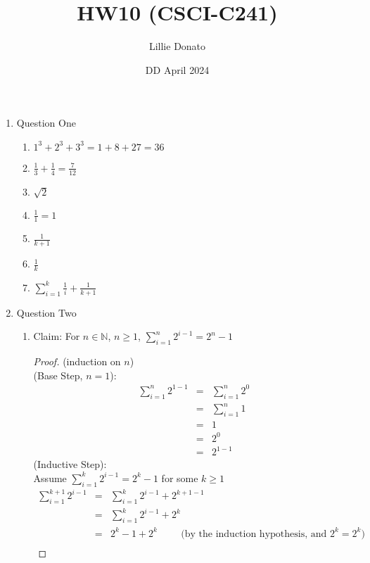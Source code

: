 \documentclass{article}
\title{HW10 (CSCI-C241)}
\author{Lillie Donato}
\date{DD April 2024}
\begin{document}
\maketitle

\begin{enumerate}
    \item Question One
    \begin{enumerate}
        \item $1^3 + 2^3 + 3^3 = 1 + 8 + 27 = 36$
        \item $\frac{1}{3} + \frac{1}{4} = \frac{7}{12}$
        \item $\sqrt{2}$
        \item $\frac{1}{1} = 1$
        \item $\frac{1}{k+1}$
        \item $\frac{1}{k}$
        \item $\sum\limits_{i=1}^{k}{\frac{1}{i}} + \frac{1}{k+1}$
    \end{enumerate}
    \item Question Two
    \begin{enumerate}
        \item Claim: For $n \in \mathbb{N}$, $n \geq 1$, $\sum\limits_{i=1}^{n}{2^{i-1} = 2^n - 1}$
        \begin{proof}
            (induction on $n$) \\
            (Base Step, $n=1$):
            \begin{eqnarray}
                \sum\limits_{i=1}^{n}{2^{1-1}} &=& \sum\limits_{i=1}^{n}{2^0} \\
                &=& \sum\limits_{i=1}^{n}{1} \\
                &=& 1 \\
                &=& 2^0 \\
                &=& 2^{1-1}
            \end{eqnarray}
            (Inductive Step): \\
            Assume $\sum\limits_{i=1}^{k}{2^{i-1}} = 2^k - 1$ for some $k \geq 1$
            \begin{eqnarray}
                \sum\limits_{i=1}^{k+1}{2^{i-1}} &=& \sum\limits_{i=1}^{k}{2^{i-1}} + 2^{k+1-1} \\
                &=& \sum\limits_{i=1}^{k}{2^{i-1}} + 2^k \\
                &=& 2^k - 1 + 2^k \hspace{1cm} \text{(by the induction hypothesis, and $2^k = 2^k$)} \\

\end{eqnarray}
\end{proof}
\end{enumerate}
\end{enumerate}
\end{document}
